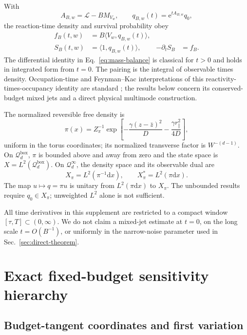 \documentclass[aps,physrev,onecolumn,amsmath,amssymb,longbibliography]{revtex4-2}
\newcommand{\dd}{\mathrm d}
\newcommand{\e}{\mathrm e}
\newcommand{\Lfree}{\mathcal L}
\newcommand{\Qbox}{\mathcal Q_d^{\mathrm{box}}}
\newcommand{\Qinf}{\mathcal Q_d^{\infty}}
\begin{document}
With
\begin{equation}
 A_{B,w}=\Lfree-BM_{V_w},\qquad
 q_{B,w}(t)=\e^{tA_{B,w}}q_0,
 \label{eq:killed-state}
\end{equation}
the reaction-time density and survival probability obey
\begin{align}
 f_B(t,w)&=B\langle V_w,q_{B,w}(t)\rangle,
 \label{eq:reaction-density}\\
 S_B(t,w)&=\langle1,q_{B,w}(t)\rangle,
 &-\partial_tS_B&=f_B.
 \label{eq:mass-balance}
\end{align}
The differential identity in Eq.~\eqref{eq:mass-balance} is classical for
\(t>0\) and holds in integrated form from \(t=0\).  The pairing is the integral
of observable times density.  Occupation-time
and Feynman--Kac interpretations of this reactivity-times-occupancy identity
are standard \cite{bressloff2022feynmanKac,grebenkov2020multiple}; the results
below concern its conserved-budget mixed jets and a direct physical
multimode construction.

The normalized reversible free density is
\begin{equation}
 \pi(x)=Z_\pi^{-1}
 \exp\!\left[-\frac{\gamma(z-\bar z)^2}{D}
              -\frac{\gamma r_\parallel^2}{4D}\right],
 \label{eq:pi-generic}
\end{equation}
uniform in the torus coordinates; its normalized transverse factor is
\(W^{-(d-1)}\).  On \(\Qbox\), \(\pi\) is bounded above
and away from zero and the state space is \(X=L^2(\Qbox)\).  On \(\Qinf\),
the density space and its observable dual are
\begin{equation}
 X_\pi=L^2(\pi^{-1}\dd x),\qquad
 X_\pi^*=L^2(\pi\dd x).
 \label{eq:weighted-spaces}
\end{equation}
The map \(u\mapsto q=\pi u\) is unitary from \(L^2(\pi\dd x)\) to
\(X_\pi\).  The unbounded results require \(q_0\in X_\pi\); unweighted
\(L^2\) alone is not sufficient.

All time derivatives in this supplement are restricted to a compact window
\([\tau,T]\subset(0,\infty)\).  We do not claim a mixed-jet estimate at
\(t=0\), on the long scale \(t=O(B^{-1})\), or uniformly in the narrow-noise
parameter used in Sec.~\ref{sec:direct-theorem}.

\section{Exact fixed-budget sensitivity hierarchy}
\label{sec:sensitivity}

\subsection{Budget-tangent coordinates and first variation}
\end{document}

